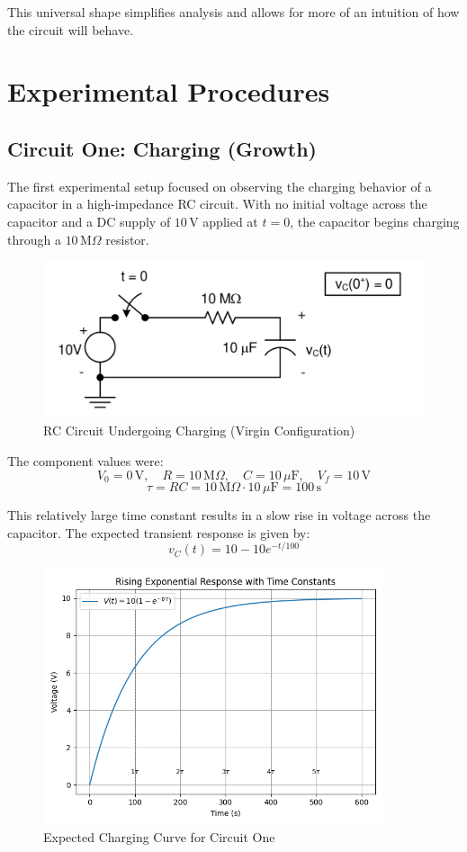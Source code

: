 \documentclass[12pt]{article}
\begin{document}
This universal shape simplifies analysis and allows for more of an intuition of
how the circuit will behave.


\section{Experimental Procedures}

\subsection{Circuit One: Charging (Growth)}
The first experimental setup focused on observing the charging behavior of a capacitor in a high-impedance RC circuit. With no initial voltage across the capacitor and a DC supply of $10\,\mathrm{V}$ applied at $t = 0$, the capacitor begins charging through a $10\,\mathrm{M}\Omega$ resistor.

\begin{figure}[H]
	\centering
	\includegraphics[width=\textwidth]{e5_1}
	\caption{RC Circuit Undergoing Charging (Virgin Configuration)}
	\label{fig:circuit1}
\end{figure}

The component values were:
\[
	V_0 = 0\,\mathrm{V}, \quad R = 10\,\mathrm{M}\Omega, \quad C = 10\,\mu\mathrm{F}, \quad V_f = 10\,\mathrm{V}
\]
\[
	\tau = RC = 10\,\mathrm{M}\Omega \cdot 10\,\mu\mathrm{F} = 100\,\mathrm{s}
\]

This relatively large time constant results in a slow rise in voltage across the capacitor. The expected transient response is given by:
\[
	v_C(t) = 10 - 10e^{-t/100}
\]

\begin{figure}[H]
	\centering
	\includegraphics[width=10cm]{05_exp1}
	\caption{Expected Charging Curve for Circuit One}
	\label{fig:circuitonegraph}
\end{figure}
\end{document}
